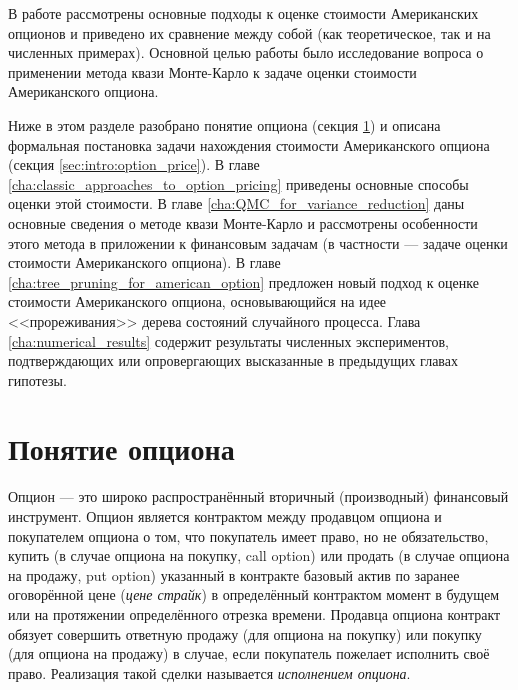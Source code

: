 \intro
В работе рассмотрены основные подходы к оценке стоимости Американских опционов и приведено их сравнение между собой (как теоретическое, так и на численных примерах). Основной целью работы было исследование вопроса о применении метода квази Монте-Карло к задаче оценки стоимости Американского опциона.

Ниже в этом разделе разобрано понятие опциона (секция \ref{sec:intro:option_definition}) и описана формальная постановка задачи нахождения стоимости Американского опциона (секция \ref{sec:intro:option_price}). В главе \ref{cha:classic_approaches_to_option_pricing} приведены основные способы оценки этой стоимости. В главе \ref{cha:QMC_for_variance_reduction} даны основные сведения о методе квази Монте-Карло и рассмотрены особенности этого метода в приложении к финансовым задачам (в частности --- задаче оценки стоимости Американского опциона). В главе \ref{cha:tree_pruning_for_american_option} предложен новый подход к оценке стоимости Американского опциона, основывающийся на идее <<прореживания>> дерева состояний случайного процесса. Глава \ref{cha:numerical_results} содержит результаты численных экспериментов, подтверждающих или опровергающих высказанные в предыдущих главах гипотезы.

\section{Понятие опциона} %
\label{sec:intro:option_definition}

Опцион --- это широко распространённый вторичный (производный) финансовый инструмент. Опцион является контрактом между продавцом опциона и покупателем опциона о том, что покупатель имеет право, но не обязательство, купить (в случае опциона на покупку, call option) или продать (в случае опциона на продажу, put option) указанный в контракте базовый актив по заранее оговорённой цене (\emph{цене страйк}) в определённый контрактом момент в будущем или на протяжении определённого отрезка времени. Продавца опциона контракт обязует совершить ответную продажу (для опциона на покупку) или покупку (для опциона на продажу) в случае, если покупатель пожелает исполнить своё право. Реализация такой сделки называется \emph{исполнением опциона}.

